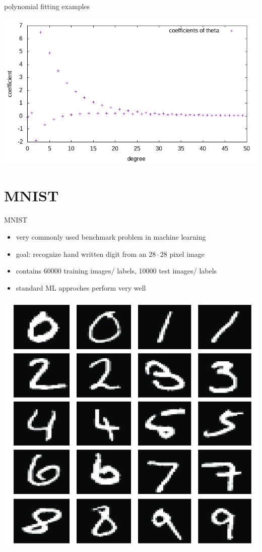 \documentclass{beamer}
\begin{document}
\begin{frame}{polynomial fitting examples}
\begin{center}
\includegraphics[scale=0.6]{source/theta_coefficients_1.png}
\end{center}
\end{frame}


\section{MNIST}

\begin{frame}{MNIST}
\begin{itemize}
	\item very commonly used benchmark problem in machine learning
	\item goal: recognize hand written digit from an \(28 \cdot 28\) pixel image
	\item contains 60000 training images/ labels, 10000 test images/ labels
	\item standard ML approches perform very well
\end{itemize}
\begin{center}
	\includegraphics[scale=0.15]{source/mnist.png}
\end{center}
\end{frame}
\end{document}
